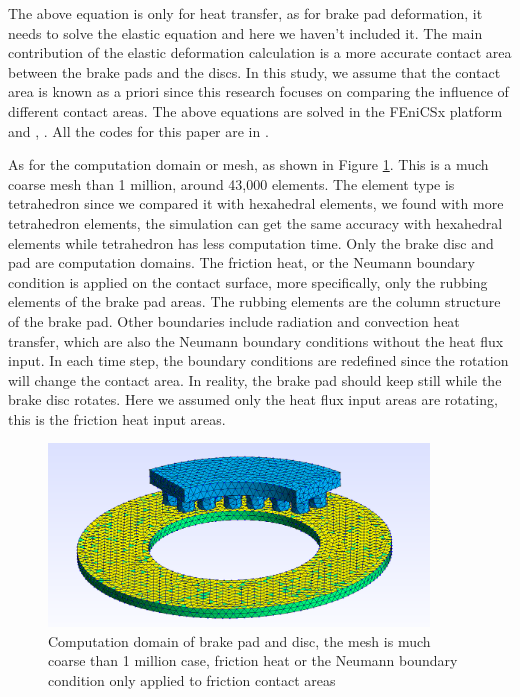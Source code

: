 The above equation is only for heat transfer, as for brake pad deformation, it needs to solve the elastic equation and here we haven't included it. The main contribution of the elastic deformation calculation is a more accurate contact area between the brake pads and the discs. In this study, we assume that the contact area is known as a priori since this research focuses on comparing the influence of different contact areas. The above equations are solved in the FEniCSx platform \cite{baratta_dolfinx_2023} and \cite{scroggs_construction_2022}, \cite{alnaes_unified_2014}. All the codes for this paper are in \cite{zhang_thermal_2025}.

As for the computation domain or mesh, as shown in Figure \ref{fig:coarse mesh}. This is a much coarse mesh than 1 million, around 43,000 elements. The element type is tetrahedron since we compared it with hexahedral elements, we found with more tetrahedron elements, the simulation can get the same accuracy with hexahedral elements while tetrahedron has less computation time. Only the brake disc and pad are computation domains. The friction heat, or the Neumann boundary condition is applied on the contact surface, more specifically, only the rubbing elements of the brake pad areas. The rubbing elements are the column structure of the brake pad. Other boundaries include radiation and convection heat transfer, which are also the Neumann boundary conditions without the heat flux input. In each time step, the boundary conditions are redefined since the rotation will change the contact area. In reality, the brake pad should keep still while the brake disc rotates. Here we assumed only the heat flux input areas are rotating, this is the friction heat input areas.

\begin{figure}[h]
    \centering
    \includegraphics[width=0.9\textwidth]{book/chapters/zhang/graphics/3d surface.png}
    \caption{Computation domain of brake pad and disc, the mesh is much coarse than 1 million case, friction heat or the Neumann boundary condition only applied to friction contact areas}
    \label{fig:coarse mesh}
\end{figure}


